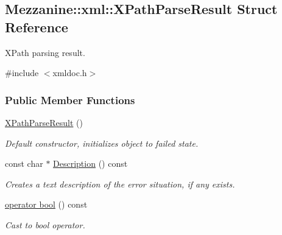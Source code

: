 \hypertarget{structMezzanine_1_1xml_1_1XPathParseResult}{
\subsection{Mezzanine::xml::XPathParseResult Struct Reference}
\label{structMezzanine_1_1xml_1_1XPathParseResult}
}


XPath parsing result.  




{\ttfamily \#include $<$xmldoc.h$>$}

\subsubsection*{Public Member Functions}
\begin{DoxyCompactItemize}
\item 
\hypertarget{structMezzanine_1_1xml_1_1XPathParseResult_ae73dd4d4d4280b84cbc73726f3993ab8}{
\hyperlink{structMezzanine_1_1xml_1_1XPathParseResult_ae73dd4d4d4280b84cbc73726f3993ab8}{XPathParseResult} ()}
\label{structMezzanine_1_1xml_1_1XPathParseResult_ae73dd4d4d4280b84cbc73726f3993ab8}

\begin{DoxyCompactList}\small\item\em Default constructor, initializes object to failed state. \item\end{DoxyCompactList}\item 
const char $\ast$ \hyperlink{structMezzanine_1_1xml_1_1XPathParseResult_a1c7e16a8fd998517cb8ff0abc918162c}{Description} () const 
\begin{DoxyCompactList}\small\item\em Creates a text description of the error situation, if any exists. \item\end{DoxyCompactList}\item 
\hyperlink{structMezzanine_1_1xml_1_1XPathParseResult_a7de82a94dbc4d78b1593fe6630b3acb1}{operator bool} () const 
\begin{DoxyCompactList}\small\item\em Cast to bool operator. \item\end{DoxyCompactList}\end{DoxyCompactItemize}
